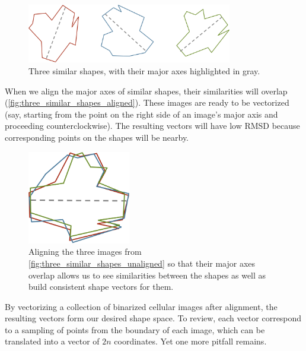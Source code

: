 \begin{figure}[h]
\centering
\mySfFamily
\includegraphics[width = 0.8\textwidth]{../images/three_similar_shapes_unaligned.png}
\caption{Three similar shapes, with their major axes highlighted in gray.}
\label{fig:three_similar_shapes_unaligned}
\end{figure}

When we align the major axes of similar shapes, their similarities will overlap (\autoref{fig:three_similar_shapes_aligned}). These images are ready to be vectorized (say, starting from the point on the right side of an image's major axis and proceeding counterclockwise). The resulting vectors will have low RMSD because corresponding points on the shapes will be nearby.

\begin{figure}[h]
\centering
\mySfFamily
\includegraphics[width = 0.4\textwidth]{../images/three_similar_shapes_aligned.png}
\caption{Aligning the three images from \autoref{fig:three_similar_shapes_unaligned} so that their major axes overlap allows us to see similarities between the shapes as well as build consistent shape vectors for them.}
\label{fig:three_similar_shapes_aligned}
\end{figure}

\begin{note}\end{note}

By vectorizing a collection of binarized cellular images after alignment, the resulting vectors form our desired shape space. To review, each vector correspond to a sampling of  points from the boundary of each image, which can be translated into a vector of $2n$ coordinates. Yet one more pitfall remains.


